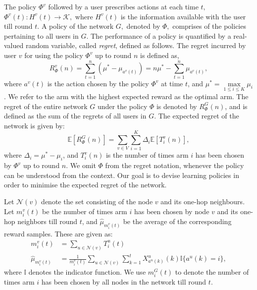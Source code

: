 \documentclass{article}
\begin{document}
The policy $\Phi^v$ followed by a user prescribes actions at each time $t,$ $\Phi^v(t): H^v(t) \rightarrow \mathcal{K},$ where $H^v(t)$ is the information available with the user till round $t.$ A policy of the network $G,$ denoted by $\Phi,$ comprises of the policies pertaining to all users in $G.$ The performance of a policy is quantified by a real-valued random variable, called \textit{regret}, defined as follows. The regret incurred by user $v$ for using the policy $\Phi^v$ up to round $n$ is defined as,
\begin{equation*}
\label{eq:2.1}
R^v_{\Phi}(n) = \sum\limits_{t=1}^n \left( \mu^* - \mu_{a^v(t)} \right)  = n \mu^* - \sum\limits_{t=1}^n \mu_{a^v(t)},
\end{equation*}
where $a^v(t)$ is the action chosen by the policy $\Phi^v$ at time $t$, and $\mu^* = \max\limits_{1 \leq i \leq K} \mu_i$. We refer to the arm with the highest expected reward as the optimal arm. The regret of the entire network $G$ under the policy $\Phi$ is denoted by $R^G_{\Phi}(n)$, and is defined as the sum of the regrets of all users in $G$. The expected regret of the network is given by:
\begin{equation}
\label{eq:2.3}
\mathbb{E} [ R^G_{\Phi}(n) ] = \sum \limits_{v \in V} \sum\limits_{i=1}^K \Delta_i \mathbb{E}  [ T_i^v(n) ],
\end{equation}
where $\Delta_i = \mu^* - \mu_i$, and $T_i^v(n)$ is the number of times arm $i$ has been chosen by $\Phi^v$ up to round $n$. We omit $\Phi$ from the regret notation, whenever the policy can be understood from the context. Our goal is to devise learning policies in order to minimise the expected regret of the network.

Let $\mathcal{N}(v)$ denote the set consisting of the node $v$ and its one-hop neighbours. Let $m^v_i(t)$ be the number of times arm $i$ has been chosen by node $v$ and its one-hop neighbors till round $t$, and  $\hat{\mu}_{m_i^v(t)}$ be the average of the corresponding reward samples. These are given as:
\begin{align*}
m^v_i(t)  &= \sum\limits_{u \in \mathcal{N}(v)} T_i^u(t) \\
\hat{\mu}_{m_i^v(t)} &=\frac{1}{{m_i^v(t)}} \sum\limits_{u \in \mathcal{N}(v)} \sum\limits_{k=1}^{t} X_{a^u(k)}^u(k) \mathbb{I} \lbrace a^u(k) = i \rbrace,
\end{align*}
where $\mathbb{I}$ denotes the indicator function. We use $m^G_i(t)$ to denote the number of times arm $i$ has been chosen by all nodes in the network till round $t$.
\end{document}
